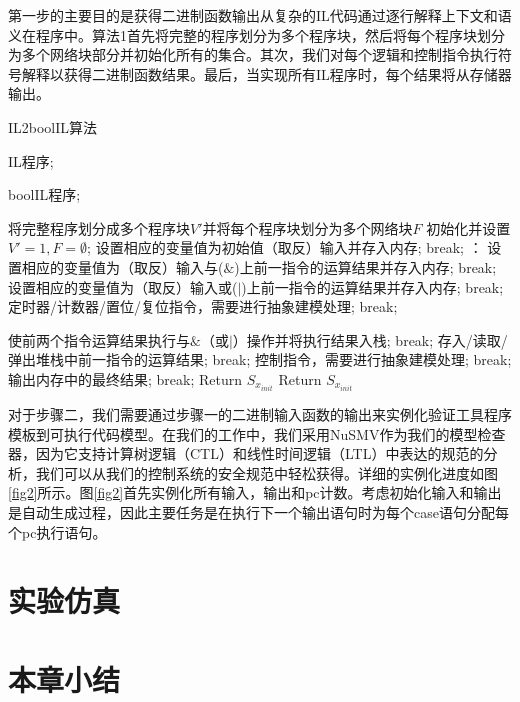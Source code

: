 第一步的主要目的是获得二进制函数输出从复杂的IL代码通过逐行解释上下文和语义在程序中。算法1首先将完整的程序划分为多个程序块，然后将每个程序块划分为多个网络块部分并初始化所有的集合。其次，我们对每个逻辑和控制指令执行符号解释以获得二进制函数结果。最后，当实现所有IL程序时，每个结果将从存储器输出。

\begin{algorithm}[!htb]
		\caption{IL2boolIL算法}
		\begin{algorithmic}[1]
			\REQUIRE %
			IL程序;
			
			\ENSURE %
			boolIL程序;  
		
			\STATE 将完整程序划分成多个程序块$V'$并将每个程序块划分为多个网络块$F$
			\STATE 初始化并设置$V'= 1,F=\emptyset$;
			\STATE 设置相应的变量值为初始值（取反）输入并存入内存; 
			\STATE break;
			\ENDCASE：
			\STATE 设置相应的变量值为（取反）输入与($\&$)上前一指令的运算结果并存入内存;
			\STATE break;
			\ENDCASE
			\STATE 设置相应的变量值为（取反）输入或($|$)上前一指令的运算结果并存入内存; 
			\STATE break;
			\ENDCASE
			\STATE 定时器/计数器/置位/复位指令，需要进行抽象建模处理; 
			\STATE break;
			\ENDCASE
			\ENDSWITCH
			\ENDFOR
			\ENDCASE
		
			\STATE 使前两个指令运算结果执行与$\&$（或$|$）操作并将执行结果入栈; 
			\STATE break;
			\ENDCASE
			\STATE 存入/读取/弹出堆栈中前一指令的运算结果;
			\STATE break;
			\ENDCASE
			\STATE 控制指令，需要进行抽象建模处理;
			\STATE break;
			\ENDCASE
			\CASE {$=$}
			\STATE 输出内存中的最终结果;
			\STATE break;
			\ENDCASE
			\DEFAULT
			\STATE Return $S_{x_{init}}$
			\ENDDEFAULT
			\ENDSWITCH
			\ENDFOR
			\STATE Return $S_{x_{init}}$
		\end{algorithmic}
	\end{algorithm}

对于步骤二，我们需要通过步骤一的二进制输入函数的输出来实例化验证工具程序模板到可执行代码模型。在我们的工作中，我们采用NuSMV作为我们的模型检查器，因为它支持计算树逻辑（CTL）和线性时间逻辑（LTL）中表达的规范的分析，我们可以从我们的控制系统的安全规范中轻松获得。详细的实例化进度如图\ref{fig2}所示。图\ref{fig2}首先实例化所有输入，输出和pc计数。考虑初始化输入和输出是自动生成过程，因此主要任务是在执行下一个输出语句时为每个case语句分配每个pc执行语句。

\section{实验仿真}
\label{sec:insertimage}

\section{本章小结}
\label{sec:insertimage}

